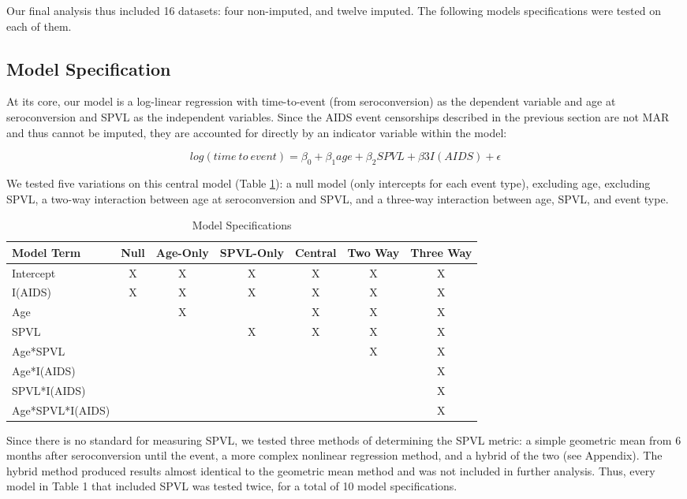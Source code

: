 \documentclass[12pt, titlepage, proquest]{article}
\begin{document}
Our final analysis thus included 16 datasets: four non-imputed, and twelve imputed. The following models specifications were tested on each of them.

\subsection{Model Specification}

At its core, our model is a log-linear regression with time-to-event (from seroconversion) as the dependent variable and age at seroconversion and SPVL as the independent variables. Since the AIDS event censorships described in the previous section are not MAR and thus cannot be imputed, they are accounted for directly by an indicator variable within the model: 

\begin{equation}
	log(time\ to\ event) = \beta_{0} + \beta_{1}age + \beta_{2}SPVL + \beta{3}I(AIDS) + \epsilon
\end{equation}

We tested five variations on this central model (Table \ref{model_specs}): a null model (only intercepts for each event type), excluding age, excluding SPVL, a two-way interaction between age at seroconversion and SPVL, and a three-way interaction between age, SPVL, and event type. 

\begin{table}[ht]
\centering
\begin{tabular}{lcccccc}
  \hline
  Model Term & Null & Age-Only & SPVL-Only & Central & Two Way & Three Way \\ \hline
  Intercept & X & X & X & X & X & X \\ 
  I(AIDS) & X & X & X & X & X & X \\ 
  Age & & X & & X & X & X \\ 
  SPVL & & & X & X & X & X \\ 
  Age*SPVL & & & & & X & X \\ 
  Age*I(AIDS) & & & & & & X \\ 
  SPVL*I(AIDS) & & & & & & X \\ 
  Age*SPVL*I(AIDS) & & & & & & X \\ 
  \hline
\end{tabular}
\caption{Model Specifications} 
\label{model_specs}
\end{table}

Since there is no standard for measuring SPVL, we tested three methods of determining the SPVL metric: a simple geometric mean from 6 months after seroconversion until the event, a more complex nonlinear regression method, and a hybrid of the two (see Appendix). The hybrid method produced results almost identical to the geometric mean method and was not included in further analysis. Thus, every model in Table 1 that included SPVL was tested twice, for a total of 10 model specifications. 
\end{document}
